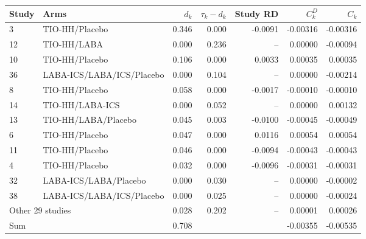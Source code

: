 \begin{tabular}{llrrrrr}
\toprule
Study & Arms & $d_k$ & $\tau_k-d_k$ & Study RD & $C^D_k$ & $C_k$ \\
\midrule
3 & TIO-HH/Placebo & 0.346 & 0.000 & -0.0091 & -0.00316 & -0.00316 \\
12 & TIO-HH/LABA & 0.000 & 0.236 & -- & 0.00000 & -0.00094 \\
10 & TIO-HH/Placebo & 0.106 & 0.000 & 0.0033 & 0.00035 & 0.00035 \\
36 & LABA-ICS/LABA/ICS/Placebo & 0.000 & 0.104 & -- & 0.00000 & -0.00214 \\
8 & TIO-HH/Placebo & 0.058 & 0.000 & -0.0017 & -0.00010 & -0.00010 \\
14 & TIO-HH/LABA-ICS & 0.000 & 0.052 & -- & 0.00000 & 0.00132 \\
13 & TIO-HH/LABA/Placebo & 0.045 & 0.003 & -0.0100 & -0.00045 & -0.00049 \\
6 & TIO-HH/Placebo & 0.047 & 0.000 & 0.0116 & 0.00054 & 0.00054 \\
11 & TIO-HH/Placebo & 0.046 & 0.000 & -0.0094 & -0.00043 & -0.00043 \\
4 & TIO-HH/Placebo & 0.032 & 0.000 & -0.0096 & -0.00031 & -0.00031 \\
32 & LABA-ICS/LABA/Placebo & 0.000 & 0.030 & -- & 0.00000 & -0.00002 \\
38 & LABA-ICS/LABA/ICS/Placebo & 0.000 & 0.025 & -- & 0.00000 & -0.00024 \\
\multicolumn{2}{l}{Other 29 studies} & 0.028 & 0.202 & -- & 0.00001 & 0.00026 \\
\midrule
Sum & & 0.708 & & & -0.00355 & -0.00535 \\
\bottomrule
\end{tabular}
